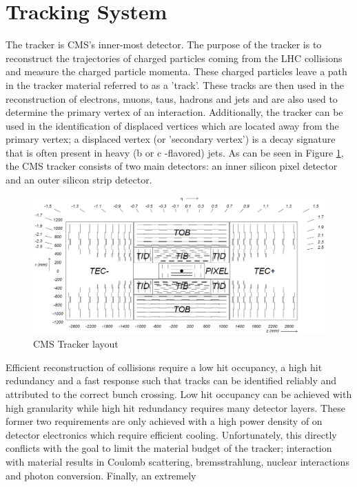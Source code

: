 \section{Tracking System}
The tracker is CMS's inner-most detector. The purpose of the 
tracker is to reconstruct the trajectories of charged particles 
coming from the LHC collisions and measure the charged particle momenta. 
These charged particles leave a path in the tracker material referred to as a 'track'. %
These tracks are then used in the reconstruction of electrons, muons, taus, hadrons and jets 
and are also used to determine the primary vertex of an interaction. Additionally, 
the tracker can be used in the identification of displaced vertices which are located
away from the primary vertex; a displaced vertex (or 'secondary vertex') is 
a decay signature that is often present 
in heavy (b or c -flavored) jets.
As can be seen in Figure \ref{fig:trackerLayout}, the CMS tracker consists of two main 
detectors: an inner silicon pixel detector and an outer silicon strip detector. 
\begin{figure}[hb]
  \centering
	\includegraphics[width=1\textwidth]{trackerImages/trackerLayout.png}
  	\caption[CMS Tracker Layout]
   	{CMS Tracker layout}
	\label{fig:trackerLayout}
\end{figure}
Efficient reconstruction of collisions require a low hit occupancy, a high hit redundancy and a
fast response such that tracks can be identified reliably and attributed to the correct bunch crossing.
Low hit occupancy can be achieved with high granularity while high hit redundancy requires
many detector layers. These former two requirements are only achieved with a 
high power density of on detector electronics which require efficient cooling. 
Unfortunately, this directly conflicts with the goal to limit the material 
budget of the tracker; interaction with material results in Coulomb scattering,
bremsstrahlung, nuclear interactions and photon conversion. Finally, an extremely
